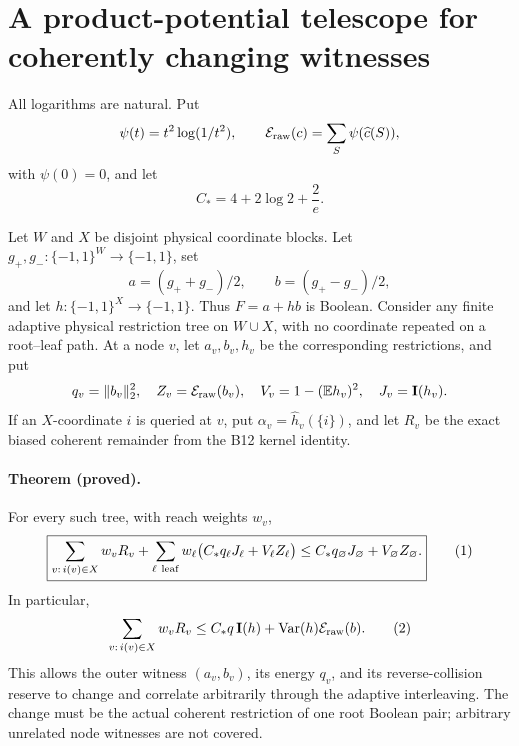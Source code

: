\section*{A product-potential telescope for coherently changing witnesses}

All logarithms are natural.  Put
\[
 \psi(t)=t^2\log(1/t^2),\qquad
 \mathcal E_{\rm raw}(c)=\sum_S\psi(\widehat c(S)),
\]
with \(\psi(0)=0\), and let
\[
 C_* = 4+2\log 2+\frac2e.
\]

Let \(W\) and \(X\) be disjoint physical coordinate blocks.  Let
\(g_+,g_-:\{-1,1\}^W\to\{-1,1\}\), set
\[
 a=(g_++g_-)/2,\qquad b=(g_+-g_-)/2,
\]
and let \(h:\{-1,1\}^X\to\{-1,1\}\).  Thus
\(F=a+hb\) is Boolean.  Consider any finite adaptive physical restriction
tree on \(W\cup X\), with no coordinate repeated on a root--leaf path.
At a node \(v\), let \(a_v,b_v,h_v\) be the corresponding restrictions,
and put
\[
 q_v=\|b_v\|_2^2,\quad Z_v=\mathcal E_{\rm raw}(b_v),\quad
 V_v=1-(\mathbb E h_v)^2,
\quad J_v=\mathbf I(h_v).
\]
If an \(X\)-coordinate \(i\) is queried at \(v\), put
\(\alpha_v=\widehat h_v(\{i\})\), and let \(R_v\) be the exact biased
coherent remainder from the B12 kernel identity.

\paragraph{Theorem (proved).}
For every such tree, with reach weights \(w_v\),
\[
 \boxed{
 \sum_{v:\,i(v)\in X}w_v R_v
 +\sum_{\ell\ {\rm leaf}}w_\ell
   \bigl(C_*q_\ell J_\ell+V_\ell Z_\ell\bigr)
 \le C_*q_\varnothing J_\varnothing+V_\varnothing Z_\varnothing.}
 \tag{1}
\]
In particular,
\[
 \sum_{v:\,i(v)\in X}w_v R_v
 \le C_*q\,\mathbf I(h)+\operatorname{Var}(h)\mathcal E_{\rm raw}(b).
 \tag{2}
\]
This allows the outer witness \((a_v,b_v)\), its energy \(q_v\), and its
reverse-collision reserve to change and correlate arbitrarily through the
adaptive interleaving.  The change must be the actual coherent restriction
of one root Boolean pair; arbitrary unrelated node witnesses are not covered.

